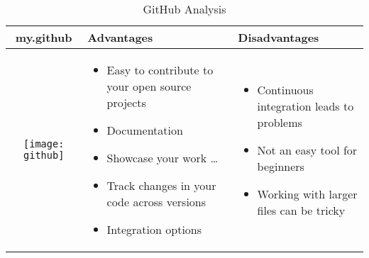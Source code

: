 \documentclass{article}
\begin{document}
	
	\begin{table}[h!]
		\centering
		\begin{tabular}{| c | m{5cm} | m{5cm} | }
			\hline
			my.github & Advantages & Disadvantages \\ \hline
			\begin{minipage}{.4\textwidth}
				\texttt{[image: github]}
			\end{minipage}
		    &
		    \begin{itemize}
		    	\item Easy to contribute to your open source projects
		    	\item Documentation
		    	\item Showcase your work \ldots
		    	\item Track changes in your code across versions
		    	\item Integration options
		    \end{itemize}
	    &
	    \begin{itemize}
	    	\item Continuous integration leads to problems
	    	\item Not an easy tool for beginners
	    	\item Working with larger files can be tricky
	    \end{itemize}
    \\ \hline
\end{tabular}
\caption{GitHub Analysis}\label{tbl:mygithub}
\end{table}
	   
\end{document}
